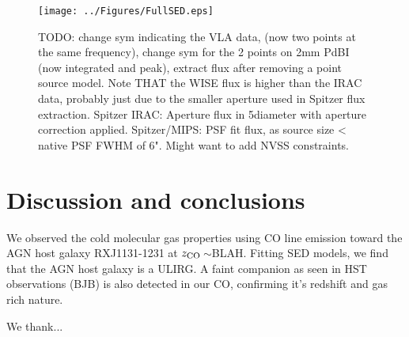 \documentclass[]{emulateapj}
\begin{document}
\begin{figure}[tbph]
\centering
\texttt{[image: ../Figures/FullSED.eps]}
\caption{TODO: change sym indicating the VLA data, (now two points at the same frequency), change sym for the 2 points on 
2mm
PdBI (now integrated and peak), extract flux after removing a point source model.
Note THAT the WISE flux is higher than the IRAC data, probably just due to the smaller aperture used in Spitzer flux 
extraction.
Spitzer IRAC: Aperture flux in 5\farcs diameter with aperture correction applied. Spitzer/MIPS: PSF fit flux, as source size < 
native PSF
FWHM of 6".
Might want to add NVSS constraints.
 \label{fig:}}
\end{figure}




\section{Discussion and conclusions}
We observed the cold molecular gas properties using CO line emission toward the AGN host galaxy RXJ1131-1231 at 
$z_{\rm CO}$\,$\sim$BLAH. 
Fitting SED models, we find that the AGN host galaxy is a ULIRG. 
A faint companion as seen in HST observations (BJB) is also detected in our CO, confirming it's redshift and gas rich nature.



\acknowledgments
We thank...



\end{document}
